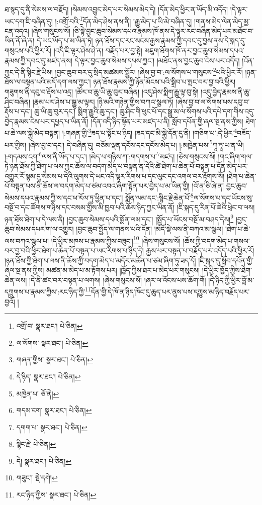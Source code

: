 ཐ་སྙད་དུ་ནི་སེམས་ལ་བརྗོད། །སེམས་འབྱུང་མེད་པར་སེམས་མེད་དེ། །དོན་མེད་ཕྱིར་ན་ཡོད་མི་འདོད། །དེ་ལྟར་ཡང་དག་ཇི་བཞིན་དུ། །:འགྲོ་བའི་\footnote{འགྲོ་བ་  སྣར་ཐང་།  པེ་ཅིན། }དོན་མེད་ཤེས་ནས་ནི། །རྒྱུ་མེད་པ་ཡི་མེ་བཞིན་དུ། །གནས་མེད་ལེན་མེད་མྱ་ངན་འདའ། །ཞེས་གསུངས་སོ། །ཅི་སྟེ་བྱང་ཆུབ་སེམས་དཔའ་རྣམས་ཁོ་ནས་དེ་ལྟར་རང་བཞིན་མེད་པར་མཐོང་བ་ཡིན་ནོ་ཞེ་ན། དེ་ཡང་ཡོད་པ་མ་ཡིན་ཏེ། ཉན་ཐོས་དང་རང་སངས་རྒྱས་རྣམས་ཀྱི་དབང་དུ་བྱས་ནས་དེ་སྐད་དུ་གསུངས་པའི་ཕྱིར་རོ། །འདི་ཇི་ལྟར་ཤེས་ཤེ་ན། བརྗོད་པར་བྱ་སྟེ། མཇུག་ཐོགས་ཁོ་ནར་བྱང་ཆུབ་སེམས་དཔའ་རྣམས་ཀྱི་དབང་དུ་མཛད་ནས། དེ་ལྟར་བྱང་ཆུབ་སེམས་དཔས་ཀྱང་། །མཐོང་ནས་བྱང་ཆུབ་ངེས་པར་འདོད། །འོན་ཀྱང་དེ་ནི་སྙིང་རྗེ་ཡིས། །བྱང་ཆུབ་བར་དུ་སྲིད་མཚམས་སྦྱོར། །ཞེས་བྱ་བ་:ལ་སོགས་པ་གསུངས་\footnote{ལ་སོགས་  སྣར་ཐང་།  པེ་ཅིན། }པའི་ཕྱིར་རོ། །ཉན་ཐོས་ལ་བསྟན་པའི་མདོ་དག་ལས་ཀྱང་། ཉན་ཐོས་རྣམས་ཀྱི་ཉོན་མོངས་པའི་སྒྲིབ་པ་སྤང་བར་བྱ་བའི་ཕྱིར། གཟུགས་ནི་དབུ་བ་རྡོས་པ་འདྲ། །ཚོར་བ་ཆུ་ཡི་ཆུ་བུར་བཞིན། །འདུ་ཤེས་སྨིག་རྒྱུ་ལྟ་བུ་སྟེ། །འདུ་བྱེད་རྣམས་ནི་ཆུ་ཤིང་བཞིན། །རྣམ་པར་ཤེས་པ་སྒྱུ་མ་ལྟར། །ཉི་མའི་གཉེན་གྱིས་བཀའ་སྩལ་ཏོ། །ཞེས་བྱ་བ་ལ་སོགས་པས་དབུ་བ་རྡོས་པ་དང་། ཆུ་ཡི་ཆུ་བུར་དང་། སྨིག་རྒྱུའི་ཆུ་དང་། ཆུ་ཤིང་གི་ཕུང་པོ་དང་སྒྱུ་མ་ལ་སོགས་པའི་དཔེ་དག་གིས་འདུ་བྱེད་རྣམས་ངེས་པར་དཔྱད་པ་ཡིན་ནོ། །དོན་འདི་ཉིད་སྟོན་པར་མཛད་པ་ནི། སློབ་དཔོན་གྱི་ཞལ་སྔ་ནས་ཀྱིས། ཐེག་པ་ཆེ་ལས་སྐྱེ་མེད་བསྟན། །:གཞན་གྱི་\footnote{གཞན་གྱིས་  སྣར་ཐང་།  པེ་ཅིན། }ཟད་པ་སྟོང་པ་ཉིད། །ཟད་དང་མི་སྐྱེ་དོན་དུ་ནི། །གཅིག་པ་:དེ་ཕྱིར་\footnote{དེ་ཉིད་  སྣར་ཐང་།  པེ་ཅིན། }བཟོད་པར་གྱིས། །ཞེས་བྱ་བ་དང་། དེ་བཞིན་དུ། བཅོམ་ལྡན་དངོས་དང་དངོས་མེད་པ། །:མཁྱེན་པས་\footnote{མཁྱེན་པ་  ཅོ་ནེ། }ཀཱ་ཏཱ་ཡ་ན་ཡི། །:གདམས་ངག་\footnote{གདམ་ངག་  སྣར་ཐང་།  པེ་ཅིན། }ལས་ནི་ཡོད་པ་དང་། །མེད་པ་གཉིས་ཀ་:གདགས་པ་\footnote{དགག་པ་  སྣར་ཐང་།  པེ་ཅིན། }མཛད། །ཅེས་གསུངས་སོ། །གང་ཞིག་གལ་ཏེ་ཉན་ཐོས་ཀྱི་ཐེག་པ་ལས་ཀྱང་ཆོས་ལ་བདག་མེད་པ་བསྟན་ན་དེའི་ཚེ་ཐེག་པ་ཆེན་པོ་བསྟན་པ་དོན་མེད་པར་འགྱུར་རོ་སྙམ་དུ་སེམས་པ་དེའི་ལུགས་དེ་ཡང་འདི་ལྟར་རིགས་པ་དང་ལུང་དང་འགལ་བར་རྟོགས་སོ། །ཐེག་པ་ཆེན་པོ་བསྟན་པས་ནི་ཆོས་ལ་བདག་མེད་པ་ཙམ་འབའ་ཞིག་སྟོན་པར་བྱེད་པ་མ་ཡིན་གྱི། །འོ་ན་ཅི་ཞེ་ན། བྱང་ཆུབ་སེམས་དཔའ་རྣམས་ཀྱི་ས་དང་ཕ་རོལ་ཏུ་ཕྱིན་པ་དང་། སྨོན་ལམ་དང་:སྙིང་རྗེ་ཆེན་པོ་\footnote{སྙིང་རྗེ་  པེ་ཅིན། }ལ་སོགས་པ་དང་ཡོངས་སུ་བསྔོ་བ་དང་ཚོགས་གཉིས་དང་བསམ་གྱིས་མི་ཁྱབ་པའི་ཆོས་ཉིད་ཀྱང་ཡིན་ནོ། །ཇི་སྐད་དུ་རིན་པོ་ཆེའི་ཕྲེང་བ་ལས། ཉན་ཐོས་ཐེག་པ་དེ་ལས་ནི། །བྱང་ཆུབ་སེམས་དཔའི་སྨོན་ལམ་དང་། །སྤྱོད་པ་ཡོངས་བསྔོ་མ་བཤད་དེས།\footnote{དེ།  སྣར་ཐང་།  པེ་ཅིན། } །བྱང་ཆུབ་སེམས་དཔར་ག་ལ་འགྱུར། །བྱང་ཆུབ་སྤྱོད་ལ་གནས་པའི་དོན། །མདོ་སྡེ་ལས་ནི་བཀའ་མ་སྩལ། །ཐེག་པ་ཆེ་ལས་བཀའ་སྩལ་པ། །དེ་ཕྱིར་མཁས་པ་རྣམས་ཀྱིས་བཟུང་།\footnote{གཟུང་།  སྡེ་དགེ། } །ཞེས་གསུངས་སོ། །ཆོས་ཀྱི་བདག་མེད་པ་གསལ་བར་བྱ་བའི་ཕྱིར་ཐེག་པ་ཆེན་པོ་བསྟན་པ་ཡང་རིགས་པ་ཉིད་དེ། རྒྱས་པར་བསྟན་པ་བརྗོད་པར་འདོད་པའི་ཕྱིར་རོ། །ཉན་ཐོས་ཀྱི་ཐེག་པ་ལས་ནི་ཆོས་ཀྱི་བདག་མེད་པ་མདོར་མཚོན་པ་ཙམ་ཞིག་ཏུ་ཟད་དོ། །ཇི་སྐད་དུ་སློབ་དཔོན་གྱི་ཞལ་སྔ་ནས་ཀྱིས། མཚན་མ་མེད་པ་མ་རྟོགས་པར། །ཁྱོད་ཀྱིས་ཐར་པ་མེད་པར་གསུངས། །དེ་ཕྱིར་ཁྱོད་ཀྱིས་ཐེག་ཆེན་ལས། །དེ་ནི་ཚང་བར་བསྟན་པ་ལགས། །ཞེས་གསུངས་སོ། །ཞར་ལ་འོངས་པས་ཆོག་གོ། །དེ་ཉིད་ཀྱི་ཕྱིར་བློ་མ་དཀྲུགས་པ་རྣམས་ཀྱིས་:རང་ཉིད་ཀྱི་\footnote{རང་ཉིད་ཀྱིས་  སྣར་ཐང་།  པེ་ཅིན། }དོན་གྱི་དེ་ཁོ་ན་ཉིད་ཁོང་དུ་ཆུད་པར་ནུས་པས་དཀྱུས་མ་ཉིད་བརྗོད་པར་བྱའོ། །
